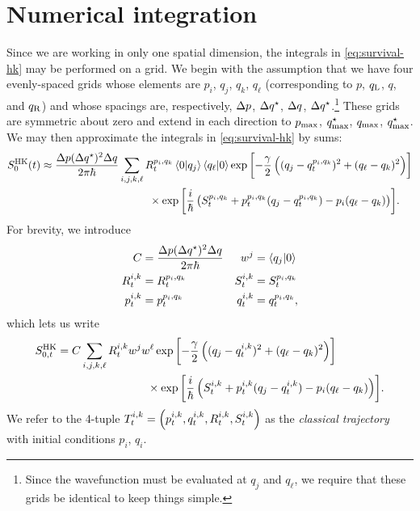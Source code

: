 \section{Numerical integration}

Since we are working in only one spatial dimension, the integrals in \cref{eq:survival-hk} may be performed on a grid.
We begin with the assumption that we have four evenly-spaced grids whose elements are $p_i$, $q_j$, $q_k$, $q_\ell$ (corresponding to $p$, $q_\mathrm{L}$, $q$, and $q_\mathrm{R}$) and whose spacings are, respectively, $\Delta p$, $\Delta q^\star$, $\Delta q$, $\Delta q^\star$.\footnote{
	Since the wavefunction must be evaluated at $q_j$ and $q_\ell$, we require that these grids be identical to keep things simple.
}
These grids are symmetric about zero and extend in each direction to $p_\mathrm{max}$, $q_\mathrm{max}^\star$, $q_\mathrm{max}$, $q_\mathrm{max}^\star$.
We may then approximate the integrals in \cref{eq:survival-hk} by sums:
\begin{align}
	S_0^\mathrm{HK}(t)
	&\approx \frac{\Delta p (\Delta q^\star)^2 \Delta q}{2 \pi \hbar} \sum_{i,j,k,\ell}
			R^{p_i,q_k}_t \braket{0 | q_j} \braket{q_\ell | 0}
			\exp{\left[ -\frac{\gamma}{2} \left( (q_j - q^{p_i,q_k}_t)^2 + (q_\ell - q_k)^2 \right) \right]} \notag \\
	&\qquad\qquad\qquad\qquad\qquad\times
			\exp{\left[ \frac{i}{\hbar} \left( S^{p_i,q_k}_t + p^{p_i,q_k}_t (q_j - q^{p_i,q_k}_t) - p_i (q_\ell - q_k) \right) \right]}.
\end{align}
For brevity, we introduce
\begin{subequations}
\begin{align}
	C
	&= \frac{\Delta p (\Delta q^\star)^2 \Delta q}{2 \pi \hbar}
	&
	w^j
	&= \braket{q_j | 0} \\
	R^{i,k}_t
	&= R^{p_i,q_k}_t
	&
	S^{i,k}_t
	&= S^{p_i,q_k}_t \\
	p^{i,k}_t
	&= p^{p_i,q_k}_t
	&
	q^{i,k}_t
	&= q^{p_i,q_k}_t,
\end{align}
\end{subequations}
which lets us write
\begin{align}
	S_{0,t}^\mathrm{HK}
	&= C \sum_{i,j,k,\ell}
			R^{i,k}_t w^j w^\ell
			\exp{\left[ -\frac{\gamma}{2} \left( (q_j - q^{i,k}_t)^2 + (q_\ell - q_k)^2 \right) \right]} \notag \\
	&\qquad\qquad\qquad\qquad\times
			\exp{\left[ \frac{i}{\hbar} \left( S^{i,k}_t + p^{i,k}_t (q_j - q^{i,k}_t) - p_i (q_\ell - q_k) \right) \right]}.
				\label{eq:survival-hk-num}
\end{align}
We refer to the 4-tuple $T^{i,k}_t = \left( p^{i,k}_t, q^{i,k}_t, R^{i,k}_t, S^{i,k}_t \right)$ as the \emph{classical trajectory} with initial conditions $p_i$, $q_i$.

